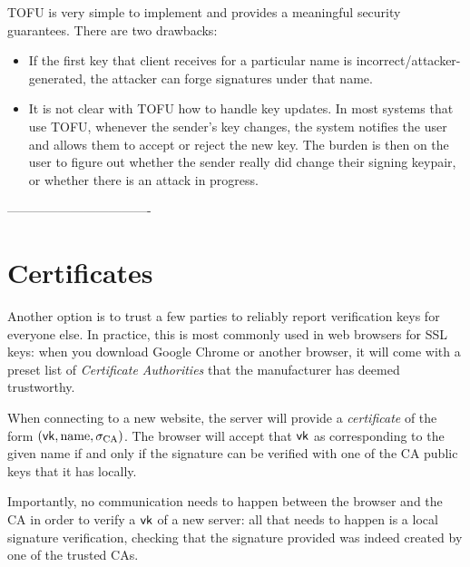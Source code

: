 TOFU is very simple to implement and provides a meaningful security
guarantees. 
There are two drawbacks:
\begin{itemize}
  \item If the first key that client receives for a particular name 
        is incorrect/attacker-generated, the attacker can forge signatures
        under that name.
  \item It is not clear with TOFU how to handle key updates. In most systems that use TOFU, whenever the sender's key changes, the system notifies the user and allows them to accept or reject the new key. The burden is then on the user to figure out whether the sender really did change their signing keypair, or whether there is an attack in progress.
\end{itemize}


----------------------------------

\section{Certificates}
Another option is to trust a few parties to reliably report verification keys for everyone else. In practice, this is most commonly used in web browsers for SSL keys: when you download Google Chrome or another browser, it will come with a preset list of \emph{Certificate Authorities} that the manufacturer has deemed trustworthy. 

When connecting to a new website, the server will provide a \emph{certificate} of the form $(\mathsf{vk}, \text{name}, \sigma_{\text{CA}})$. The browser will accept that $\mathsf{vk}$ as corresponding to the given name if and only if the signature can be verified with one of the CA public keys that it has locally.

Importantly, no communication needs to happen between the browser and the CA in order to verify a $\mathsf{vk}$ of a new server: all that needs to happen is a local signature verification, checking that the signature provided was indeed created by one of the trusted CAs.


